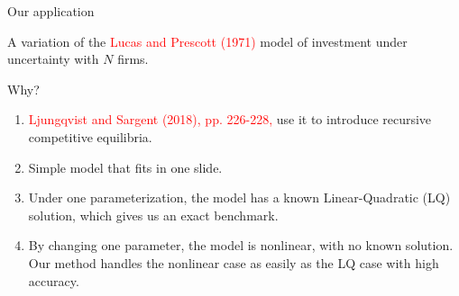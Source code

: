 \documentclass[aspectratio=169,10pt]{beamer}
\begin{document}
		\begin{frame}{Our application}
		
			A variation of the \textcolor{red}{Lucas and Prescott (1971)} model of investment under uncertainty with $N$ firms.\vspace{0.1in}
		
			Why?\vspace{0.1in}
		
			\begin{enumerate}
		
				\item \textcolor{red}{Ljungqvist and Sargent (2018), pp. 226-228,} use it to introduce recursive competitive equilibria.\vspace{0.1in}
		
				\item Simple model that fits in one slide.\vspace{0.1in}
		
				\item Under one parameterization, the model has a known Linear-Quadratic (LQ) solution, which gives us an exact benchmark.\vspace{0.1in}
		
				\item By changing one parameter, the model is nonlinear, with no known solution. Our method handles the nonlinear case as easily as the LQ case  with high accuracy.
		
			\end{enumerate}
		\end{frame}
	
		
	
\end{document}
